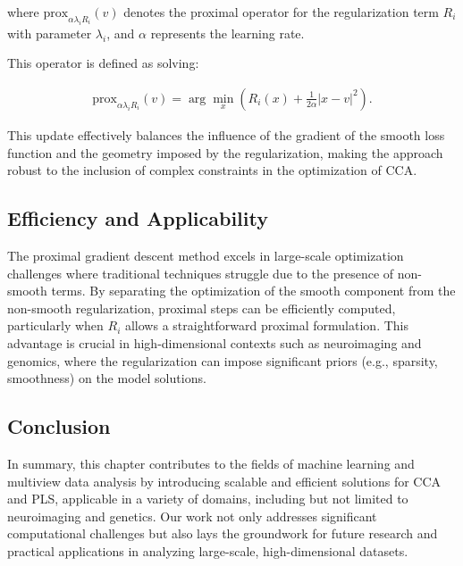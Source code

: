 where $\text{prox}_{\alpha \lambda_i R_i}(v)$ denotes the proximal operator for the regularization term $R_i$ with parameter $\lambda_i$, and $\alpha$ represents the learning rate.

This operator is defined as solving:

\begin{align*}
\text{prox}_{\alpha \lambda_i R_i}(v) = \arg \min_x \left( R_i(x) + \frac{1}{2\alpha} |x - v|^2 \right).
\end{align*}

This update effectively balances the influence of the gradient of the smooth loss function and the geometry imposed by the regularization, making the approach robust to the inclusion of complex constraints in the optimization of CCA.

\subsection{Efficiency and Applicability}

The proximal gradient descent method excels in large-scale optimization challenges where traditional techniques struggle due to the presence of non-smooth terms. By separating the optimization of the smooth component from the non-smooth regularization, proximal steps can be efficiently computed, particularly when $R_i$ allows a straightforward proximal formulation. This advantage is crucial in high-dimensional contexts such as neuroimaging and genomics, where the regularization can impose significant priors (e.g., sparsity, smoothness) on the model solutions.

\subsection{Conclusion}

In summary, this chapter contributes to the fields of machine learning and multiview data analysis by introducing scalable and efficient solutions for CCA and PLS, applicable in a variety of domains, including but not limited to neuroimaging and genetics.
Our work not only addresses significant computational challenges but also lays the groundwork for future research and practical applications in analyzing large-scale, high-dimensional datasets.